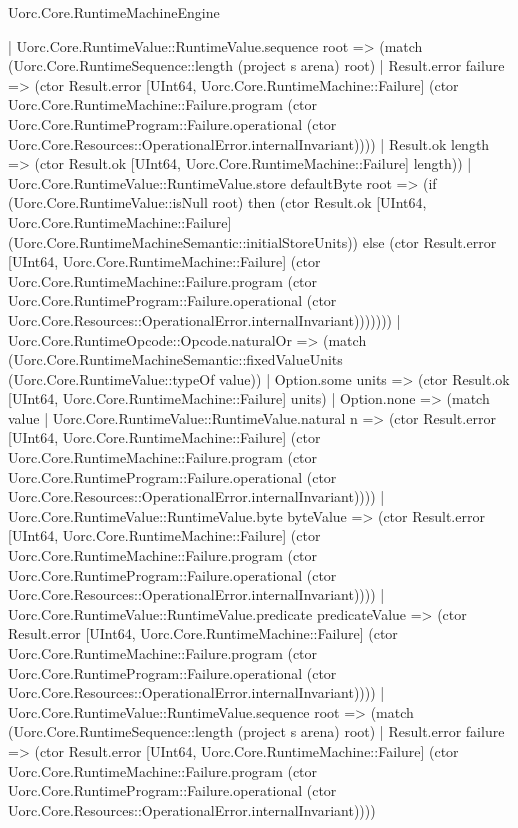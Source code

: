 \begin{lexlean}{Uorc.Core.RuntimeMachineEngine}
\begin{semanticmodule}
{              | Uorc.Core.RuntimeValue::RuntimeValue.sequence root => (match (Uorc.Core.RuntimeSequence::length (project s arena) root)
                | Result.error failure => (ctor Result.error [UInt64, Uorc.Core.RuntimeMachine::Failure] (ctor Uorc.Core.RuntimeMachine::Failure.program (ctor Uorc.Core.RuntimeProgram::Failure.operational (ctor Uorc.Core.Resources::OperationalError.internalInvariant))))
                | Result.ok length => (ctor Result.ok [UInt64, Uorc.Core.RuntimeMachine::Failure] length))
              | Uorc.Core.RuntimeValue::RuntimeValue.store defaultByte root => (if (Uorc.Core.RuntimeValue::isNull root) then (ctor Result.ok [UInt64, Uorc.Core.RuntimeMachine::Failure] (Uorc.Core.RuntimeMachineSemantic::initialStoreUnits)) else (ctor Result.error [UInt64, Uorc.Core.RuntimeMachine::Failure] (ctor Uorc.Core.RuntimeMachine::Failure.program (ctor Uorc.Core.RuntimeProgram::Failure.operational (ctor Uorc.Core.Resources::OperationalError.internalInvariant)))))))
          | Uorc.Core.RuntimeOpcode::Opcode.naturalOr => (match (Uorc.Core.RuntimeMachineSemantic::fixedValueUnits (Uorc.Core.RuntimeValue::typeOf value))
            | Option.some units => (ctor Result.ok [UInt64, Uorc.Core.RuntimeMachine::Failure] units)
            | Option.none => (match value
              | Uorc.Core.RuntimeValue::RuntimeValue.natural n => (ctor Result.error [UInt64, Uorc.Core.RuntimeMachine::Failure] (ctor Uorc.Core.RuntimeMachine::Failure.program (ctor Uorc.Core.RuntimeProgram::Failure.operational (ctor Uorc.Core.Resources::OperationalError.internalInvariant))))
              | Uorc.Core.RuntimeValue::RuntimeValue.byte byteValue => (ctor Result.error [UInt64, Uorc.Core.RuntimeMachine::Failure] (ctor Uorc.Core.RuntimeMachine::Failure.program (ctor Uorc.Core.RuntimeProgram::Failure.operational (ctor Uorc.Core.Resources::OperationalError.internalInvariant))))
              | Uorc.Core.RuntimeValue::RuntimeValue.predicate predicateValue => (ctor Result.error [UInt64, Uorc.Core.RuntimeMachine::Failure] (ctor Uorc.Core.RuntimeMachine::Failure.program (ctor Uorc.Core.RuntimeProgram::Failure.operational (ctor Uorc.Core.Resources::OperationalError.internalInvariant))))
              | Uorc.Core.RuntimeValue::RuntimeValue.sequence root => (match (Uorc.Core.RuntimeSequence::length (project s arena) root)
                | Result.error failure => (ctor Result.error [UInt64, Uorc.Core.RuntimeMachine::Failure] (ctor Uorc.Core.RuntimeMachine::Failure.program (ctor Uorc.Core.RuntimeProgram::Failure.operational (ctor Uorc.Core.Resources::OperationalError.internalInvariant))))
}
\end{semanticmodule}
\end{lexlean}
